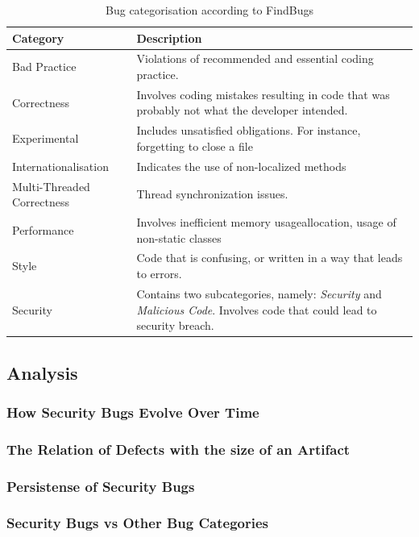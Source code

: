 \documentclass[conference]{IEEEtran}
\begin{document}
\begin{table}
\centering
\caption{Bug categorisation according to FindBugs}
\label{tbl:bug-categorisation}
\begin{tabular}{l p{15em}}
\hline
Category & Description\\
\hline
Bad Practice & Violations of recommended and essential
coding practice. \\
Correctness & Involves coding mistakes resulting in code
that was probably not what the developer intended. \\
Experimental & Includes unsatisfied obligations. For instance,
forgetting to close a file \\
Internationalisation & Indicates the use of non-localized methods \\
Multi-Threaded Correctness & Thread synchronization issues. \\
Performance & Involves inefficient memory usageallocation, usage 
of non-static classes \\
Style & Code that is confusing, or
written in a way that leads to errors.\\
Security & Contains two subcategories, namely: {\it Security} and {\it
Malicious Code}. Involves code that could lead to security breach. \\
\hline
\end{tabular}
\end{table}

\subsection{Analysis}
\label{sec:analysis}

\subsubsection{How Security Bugs Evolve Over Time}

\subsubsection{The Relation of Defects with the size of an Artifact}

\subsubsection{Persistense of Security Bugs}

\subsubsection{Security Bugs {\sc vs} Other Bug Categories}
\end{document}
